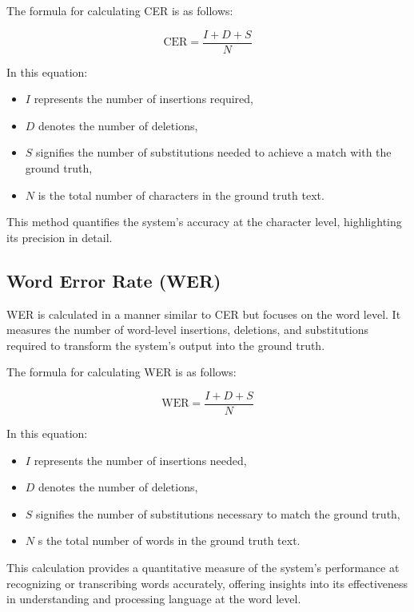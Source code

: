 The formula for calculating CER is as follows:

\begin{equation}
    \text{CER} = \frac{I+D+S}{N}
\end{equation}

In this equation:
\begin{itemize}
    \item $I$ represents the number of insertions required,
    \item $D$ denotes the number of deletions,
    \item $S$ signifies the number of substitutions needed to achieve a match with the ground truth,
    \item $N$ is the total number of characters in the ground truth text.
\end{itemize}

This method quantifies the system's accuracy at the character level, highlighting its precision in detail.

\subsection{Word Error Rate (WER)}
\label{subsec:5_wer}
WER is calculated in a manner similar to CER but focuses on the word level. It measures the number of word-level insertions, deletions, and substitutions required to transform the system's output into the ground truth.

The formula for calculating WER is as follows:

\begin{equation}
    \text{WER} = \frac{I+D+S}{N}
\end{equation}

In this equation:
\begin{itemize}
    \item $I$ represents the number of insertions needed,
    \item $D$ denotes the number of deletions,
    \item $S$ signifies the number of substitutions necessary to match the ground truth,
    \item $N$ s the total number of words in the ground truth text.
\end{itemize}

This calculation provides a quantitative measure of the system's performance at recognizing or transcribing words accurately, offering insights into its effectiveness in understanding and processing language at the word level.
